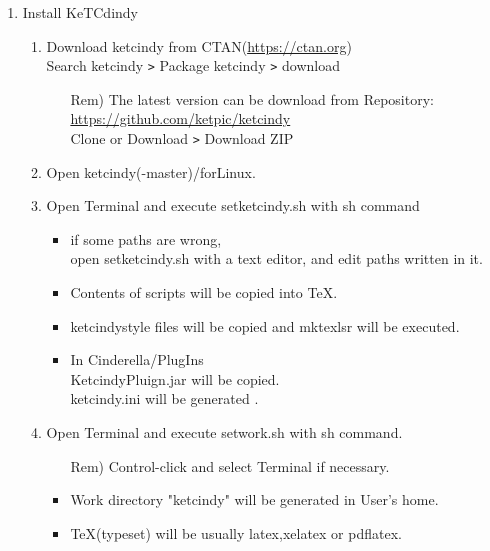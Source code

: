 \documentclass{article}
\begin{document}
\begin{enumerate}[\bf\large 1.]
\item Install KeTCdindy
  \begin{enumerate}[(1)]
  \item Download ketcindy from CTAN(\url{https://ctan.org})\\
  \hspace*{10mm}Search ketcindy \verb|>| Pack­age ketcindy \verb|>| download
    \begin{itemize}
    \item[Rem)]The latest version can be download from Repository:\\
        \hspace*{5mm}\url{https://github.com/ket­pic/ketcindy}\\
        \hspace*{10mm}Clone or Download \verb|>| Download ZIP
    \end{itemize}
  \item Open ketcindy(-master)/forLinux.
  \item Open Terminal and execute setketcindy.sh with sh command
    \begin{itemize}
    \item if some paths are wrong,\\
    \hspace*{5mm}open setketcindy.sh with a text editor, and edit paths written in it.
    \item Contents of scripts will be copied into TeX.
    \item ketcindystyle files will be copied and mktexlsr will be executed.
    \item In Cinderella/PlugIns\\
    \hspace*{5mm}KetcindyPluign.jar will be copied.\\
    \hspace*{5mm}ketcindy.ini will be generated .
    \end{itemize}
    \item Open Terminal and execute setwork.sh with sh command.
    \begin{itemize}
    \item[Rem)]Control-click and select Terminal if necessary. 
    \end{itemize}
    \begin{itemize}
    \item Work directory "ketcindy" will be generated in User's home.
    \item TeX(typeset) will be usually latex,xelatex or pdflatex.

\end{itemize}
\end{enumerate}
\end{enumerate}
\end{document}
